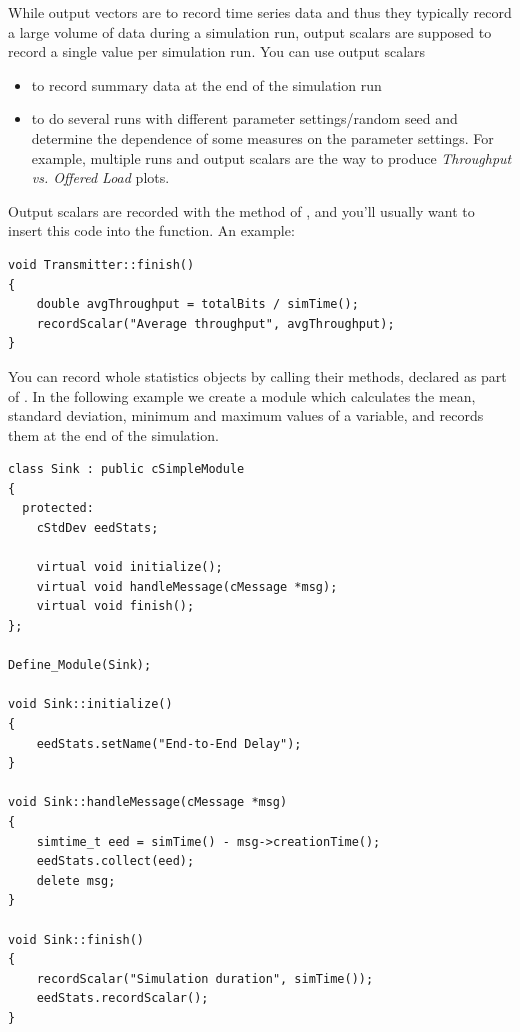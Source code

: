 While output vectors are to record time series data and thus they
typically record a large volume of data during a simulation run,
output scalars are supposed to record a single
value per simulation run. You can use output scalars

\begin{itemize}
\item{to record summary data at the end of the simulation run}
\item{to do several runs with different parameter settings/random seed
    and determine the dependence of some measures on the parameter
    settings. For example, multiple runs and output scalars are the
    way to produce \textit{Throughput vs. Offered Load} plots.}
\end{itemize}

Output scalars are recorded with the  method of
, and you'll usually want to insert this code
into the  function. An example:

\begin{verbatim}
void Transmitter::finish()
{
    double avgThroughput = totalBits / simTime();
    recordScalar("Average throughput", avgThroughput);
}
\end{verbatim}

You can record whole statistics objects by calling their 
methods, declared as part of . In the following example
we create a  module which calculates the mean, standard
deviation, minimum and maximum values of a variable, and records them at the
end of the simulation.

\begin{verbatim}
class Sink : public cSimpleModule
{
  protected:
    cStdDev eedStats;

    virtual void initialize();
    virtual void handleMessage(cMessage *msg);
    virtual void finish();
};

Define_Module(Sink);

void Sink::initialize()
{
    eedStats.setName("End-to-End Delay");
}

void Sink::handleMessage(cMessage *msg)
{
    simtime_t eed = simTime() - msg->creationTime();
    eedStats.collect(eed);
    delete msg;
}

void Sink::finish()
{
    recordScalar("Simulation duration", simTime());
    eedStats.recordScalar();
}
\end{verbatim}

